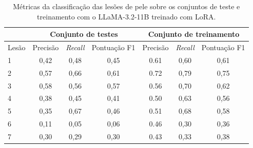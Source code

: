 \begin{table}[ht]
    \caption{\small Métricas da classificação das lesões de pele sobre os conjuntos de teste e treinamento com o
    \ac{LLaMA}-3.2-11B treinado com \ac{LoRA}.}
    \centering
    \begin{tabular}{l|c|c|c|c|c|c}
        \hline
              & \multicolumn{3}{c|}{Conjunto de testes} & \multicolumn{3}{c}{Conjunto de treinamento}
        \\ \hline
        Lesão & Precisão                                & \textit{Recall}                             & Pontuação
        F1    & Precisão                                & \textit{Recall}                             & Pontuação
        F1
        \\
        \hline
        1     & 0,42                                    & 0,48                                        & 0,45      &
        0.61  & 0,60                                    & 0,61                                                      \\
        2     & 0,57                                    & 0,66                                        & 0,61      &
        0.72  & 0,79                                    & 0,75                                                      \\
        3     & 0,58                                    & 0,56                                        & 0,57      &
        0.56  & 0,70                                    & 0,62                                                      \\
        4     & 0,38                                    & 0,45                                        & 0,41      &
        0.50  & 0,63                                    & 0,56                                                      \\
        5     & 0,35                                    & 0,67                                        & 0,46      &
        0.51  & 0,68                                    & 0,58                                                      \\
        6     & 0,11                                    & 0,05                                        & 0,06      &
        0.46  & 0,30                                    & 0,36                                                      \\
        7     & 0,30                                    & 0,29                                        & 0,30      &
        0.43  & 0,33                                    & 0,38                                                      \\

\end{tabular}
\end{table}
